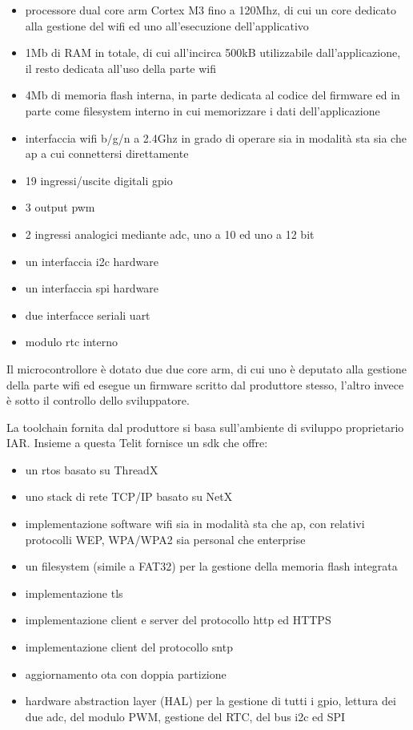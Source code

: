 \documentclass[12pt,a4paper,twoside,titlepage]{book}
\begin{document}
\begin{itemize}
    \item processore dual core \Gls{arm} Cortex M3 fino a 120Mhz, di cui un core dedicato
        alla gestione del \Gls{wifi} ed uno all'esecuzione dell'applicativo
    \item 1Mb di RAM in totale, di cui all'incirca 500kB utilizzabile dall'applicazione,
        il resto dedicata all'uso della parte \Gls{wifi}
    \item 4Mb di memoria flash interna, in parte dedicata al codice del \gls{firmware} ed
        in parte come filesystem interno in cui memorizzare i dati dell'applicazione
    \item interfaccia \Gls{wifi} b/g/n a 2.4Ghz in grado di operare sia in modalità \Gls{sta} 
        sia che \Gls{ap} a cui connettersi direttamente
    \item 19 ingressi/uscite digitali \acrfull{gpio} 
    \item 3 output \acrfull{pwm}
    \item 2 ingressi analogici mediante \acrfull{adc}, uno a 10 ed uno a 12 bit
    \item un interfaccia \Gls{i2c} hardware
    \item un interfaccia \acrfull{spi} hardware
    \item due interfacce seriali \acrshort{uart}
    \item modulo \acrfull{rtc} interno
\end{itemize}

Il microcontrollore è dotato due due core \Gls{arm}, di cui uno è deputato alla gestione
della parte \Gls{wifi} ed esegue un \gls{firmware} scritto dal produttore stesso, l'altro 
invece è sotto il controllo dello sviluppatore. 

La toolchain fornita dal produttore si basa sull'ambiente di sviluppo proprietario IAR. Insieme 
a questa Telit fornisce un \acrfull{sdk} che offre:

\begin{itemize}
    \item un \Gls{rtos} basato su ThreadX
    \item uno stack di rete TCP/IP basato su NetX
    \item implementazione software \Gls{wifi} sia in modalità \acrfull{sta} che \acrfull{ap},
        con relativi protocolli WEP, WPA/WPA2 sia personal che enterprise
    \item un filesystem (simile a FAT32) per la gestione della memoria flash integrata
    \item implementazione \gls{tls}
    \item implementazione client e server del protocollo \acrshort{http} ed HTTPS
    \item implementazione client del protocollo \acrfull{sntp} 
    \item aggiornamento \acrshort{ota} con doppia partizione
    \item hardware abstraction layer (HAL) per la gestione di tutti i \Gls{gpio},
        lettura dei due \Gls{adc}, del modulo PWM, gestione del RTC, del bus i2c ed SPI
\end{itemize}
\end{document}
